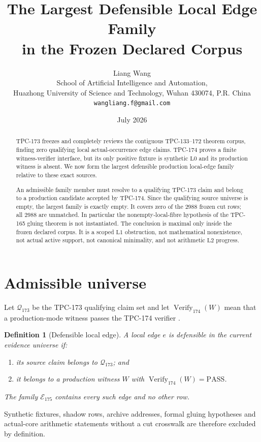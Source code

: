 \documentclass[11pt]{article}
\title{\textbf{The Largest Defensible Local Edge Family}\\
\textbf{in the Frozen Declared Corpus}}
\author{Liang Wang\\
School of Artificial Intelligence and Automation,\\
Huazhong University of Science and Technology, Wuhan 430074, P.R. China\\
\texttt{wangliang.f@gmail.com}}
\date{July 2026}
\newtheorem{definition}[theorem]{Definition}
\newcommand{\Lzero}{\mathrm{L0}}
\newcommand{\Lone}{\mathrm{L1}}
\newcommand{\Ltwo}{\mathrm{L2}}
\begin{document}
\maketitle

\begin{abstract}
TPC-173 freezes and completely reviews the contiguous TPC-133--172 theorem
corpus, finding zero qualifying local actual-occurrence edge claims.
TPC-174 proves a finite witness-verifier interface, but its only positive
fixture is synthetic \(\Lzero\) and its production witness is absent.  We
now form the largest defensible production local-edge family relative to
these exact sources.

An admissible family member must resolve to a qualifying TPC-173 claim and
belong to a production candidate accepted by TPC-174.  Since the qualifying
source universe is empty, the largest family is exactly empty.  It covers
zero of the \(2988\) frozen cut rows; all \(2988\) are unmatched.  In
particular the nonempty-local-fibre hypothesis of the TPC-165 gluing theorem
is not instantiated.  The conclusion is maximal only inside the frozen
declared corpus.  It is a scoped \(\Lone\) obstruction, not mathematical
nonexistence, not actual active support, not canonical minimality, and not
arithmetic \(\Ltwo\) progress.
\end{abstract}

\section{Admissible universe}

Let \(\mathcal Q_{173}\) be the TPC-173 qualifying claim set and let
\(\operatorname{Verify}_{174}(W)\) mean that a production-mode witness
passes the TPC-174 verifier \citep{WangTPC173,WangTPC174}.

\begin{definition}[Defensible local edge]\label{def:edge}
A local edge \(e\) is defensible in the current evidence universe if:
\begin{enumerate}
\item its source claim belongs to \(\mathcal Q_{173}\); and
\item it belongs to a production witness \(W\) with
 \(\operatorname{Verify}_{174}(W)=\mathrm{PASS}\).
\end{enumerate}
The family \(\mathcal E_{175}\) contains every such edge and no other row.
\end{definition}

Synthetic fixtures, shadow rows, archive addresses, formal gluing
hypotheses and actual-core arithmetic statements without a cut crosswalk are
therefore excluded by definition.
\end{document}
